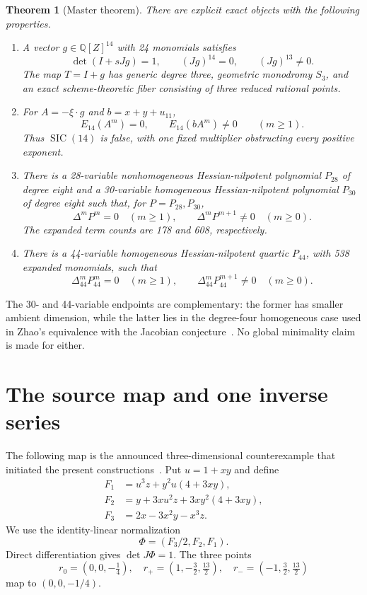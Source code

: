 \documentclass[11pt]{article}
\newtheorem{theorem}{Theorem}
\newcommand{\Q}{\mathbb Q}
\newcommand{\SIC}{\operatorname{SIC}}
\begin{document}
\begin{theorem}[Master theorem]\label{thm:master}
There are explicit exact objects with the following properties.
\begin{enumerate}
\item A vector $g\in\Q[Z]^{14}$ with 24 monomials satisfies
\[
 \det(I+sJg)=1,\qquad (Jg)^{14}=0,\qquad (Jg)^{13}\ne0.
\]
The map $T=I+g$ has generic degree three, geometric monodromy $S_3$, and an
exact scheme-theoretic fiber consisting of three reduced rational points.
\item For $A=-\xi\cdot g$ and $b=x+y+u_{11}$,
\[
 E_{14}(A^m)=0,\qquad E_{14}(bA^m)\ne0\qquad(m\ge1).
\]
Thus $\SIC(14)$ is false, with one fixed multiplier obstructing every
positive exponent.
\item There is a 28-variable nonhomogeneous Hessian-nilpotent polynomial
$P_{28}$ of degree eight and a 30-variable homogeneous Hessian-nilpotent
polynomial $P_{30}$ of degree eight such that, for $P=P_{28},P_{30}$,
\[
 \Delta^m P^m=0\quad(m\ge1),\qquad
 \Delta^mP^{m+1}\ne0\quad(m\ge0).
\]
The expanded term counts are 178 and 608, respectively.
\item There is a 44-variable homogeneous Hessian-nilpotent quartic $P_{44}$,
with 538 expanded monomials, such that
\[
 \Delta_{44}^mP_{44}^m=0\quad(m\ge1),\qquad
 \Delta_{44}^mP_{44}^{m+1}\ne0\quad(m\ge0).
\]
\end{enumerate}
\end{theorem}

The 30- and 44-variable endpoints are complementary: the former has smaller
ambient dimension, while the latter lies in the degree-four homogeneous case
used in Zhao's equivalence with the Jacobian conjecture~\cite{zhao-hnp}.  No global
minimality claim is made for either.

\section{The source map and one inverse series}

The following map is the announced three-dimensional counterexample that
initiated the present constructions~\cite{alpoge}.  Put $u=1+xy$ and define
\begin{align}
 F_1&=u^3z+y^2u(4+3xy),\nonumber\\
 F_2&=y+3xu^2z+3xy^2(4+3xy),\nonumber\\
 F_3&=2x-3x^2y-x^3z.\label{eq:F}
\end{align}
We use the identity-linear normalization
\begin{equation}
 \Phi=(F_3/2,F_2,F_1).
 \label{eq:Phi}
\end{equation}
Direct differentiation gives $\det J\Phi=1$.  The three points
\begin{equation}
 r_0=(0,0,-\tfrac14),\quad
 r_+=(1,-\tfrac32,\tfrac{13}2),\quad
 r_-=(-1,\tfrac32,\tfrac{13}2)
 \label{eq:sourcepoints}
\end{equation}
map to $(0,0,-1/4)$.
\end{document}
